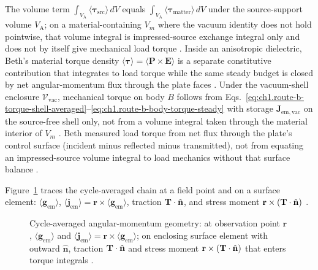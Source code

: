 The volume term $\int_{V_{\mathrm{A}}}\langle\boldsymbol{\tau}_{\mathrm{src}}\rangle\,dV$ equals $\int_{V_{\mathrm{A}}}\langle\boldsymbol{\tau}_{\mathrm{matter}}\rangle\,dV$ under the source-support volume $V_{\mathrm{A}}$; on a material-containing $V_m$ where the vacuum identity does not hold pointwise, that volume integral is impressed-source exchange integral only and does not by itself give mechanical load torque \cite{stratton1941}. Inside an anisotropic dielectric, Beth's material torque density $\langle\boldsymbol\tau\rangle=\langle\mathbf P\times\mathbf E\rangle$ is a separate constitutive contribution that integrates to load torque while the same steady budget is closed by net angular-momentum flux through the plate faces \cite{beth1936,stratton1941}. Under the vacuum-shell enclosure $\mathcal{V}_{\mathrm{vac}}$, mechanical torque on body $B$ follows from Eqs.~\eqref{eq:ch1.route-b-torque-shell-averaged}--\eqref{eq:ch1.route-b-body-torque-steady} with storage $\mathbf{J}_{\mathrm{em,vac}}$ on the source-free shell only, not from a volume integral taken through the material interior of $V_m$ \cite{harrington2001}. Beth \cite{beth1936} measured load torque from net flux through the plate's control surface (incident minus reflected minus transmitted), not from equating an impressed-source volume integral to load mechanics without that surface balance \cite{stratton1941,beth1936}.

Figure~\ref{fig:ch1.momentum-angular-geometry} traces the cycle-averaged chain at a field point and on a surface element: $\langle\mathbf{g}_{\mathrm{em}}\rangle$, $\langle\mathbf{j}_{\mathrm{em}}\rangle=\mathbf{r}\times\langle\mathbf{g}_{\mathrm{em}}\rangle$, traction $\mathbf{T}\cdot\hat{\mathbf{n}}$, and stress moment $\mathbf{r}\times(\mathbf{T}\cdot\hat{\mathbf{n}})$ \cite{maxwell1873,beth1936}.

\begin{figure}[t]
\centering
\VolIPhysFigWide{\VolIPhysMomentumAngularGeometry}
\caption{Cycle-averaged angular-momentum geometry: at observation point $\mathbf{r}$, $\langle\mathbf{g}_{\mathrm{em}}\rangle$ and $\langle\mathbf{j}_{\mathrm{em}}\rangle=\mathbf{r}\times\langle\mathbf{g}_{\mathrm{em}}\rangle$; on enclosing surface element with outward $\hat{\mathbf{n}}$, traction $\mathbf{T}\cdot\hat{\mathbf{n}}$ and stress moment $\mathbf{r}\times(\mathbf{T}\cdot\hat{\mathbf{n}})$ that enters torque integrals \cite{maxwell1873,beth1936,stratton1941}.}
\label{fig:ch1.momentum-angular-geometry}
\end{figure}

